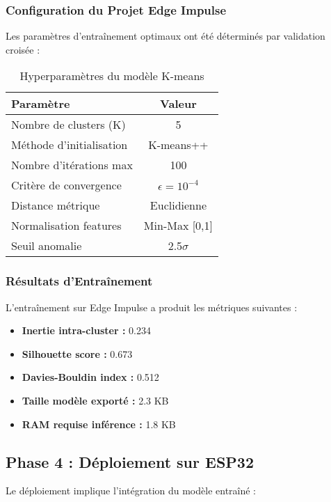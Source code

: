 \subsubsection{Configuration du Projet Edge Impulse}

Les paramètres d'entraînement optimaux ont été déterminés par validation croisée :

\begin{table}[h]
\centering
\caption{Hyperparamètres du modèle K-means}
\begin{tabular}{lc}
\toprule
\textbf{Paramètre} & \textbf{Valeur} \\
\midrule
Nombre de clusters (K) & 5 \\
Méthode d'initialisation & K-means++ \\
Nombre d'itérations max & 100 \\
Critère de convergence & $\epsilon = 10^{-4}$ \\
Distance métrique & Euclidienne \\
Normalisation features & Min-Max [0,1] \\
Seuil anomalie & 2.5$\sigma$ \\
\bottomrule
\end{tabular}
\end{table}

\subsubsection{Résultats d'Entraînement}

L'entraînement sur Edge Impulse a produit les métriques suivantes :

\begin{itemize}
    \item \textbf{Inertie intra-cluster :} 0.234
    \item \textbf{Silhouette score :} 0.673
    \item \textbf{Davies-Bouldin index :} 0.512
    \item \textbf{Taille modèle exporté :} 2.3 KB
    \item \textbf{RAM requise inférence :} 1.8 KB
\end{itemize}

\subsection{Phase 4 : Déploiement sur ESP32}

Le déploiement implique l'intégration du modèle entraîné :

